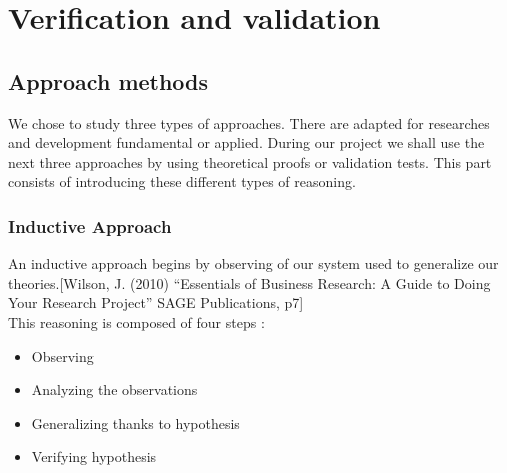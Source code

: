 \chapter{Verification and validation}

\section{Approach methods}

We chose to study three types of approaches. There are adapted for researches and development fundamental or applied. During our project we shall use the next three approaches by using theoretical proofs or validation tests. This part consists of introducing these different types of reasoning.

\subsection{Inductive Approach}
An inductive approach begins by observing of our system used to generalize our theories.[Wilson, J. (2010) “Essentials of Business Research: A Guide to Doing Your Research Project” SAGE Publications, p7] \cite{buisnessREsearchWilson}\\
This reasoning is composed of four steps :
\begin{itemize}
\item Observing
\item Analyzing the observations
\item Generalizing thanks to hypothesis
\item Verifying hypothesis
\end{itemize}

